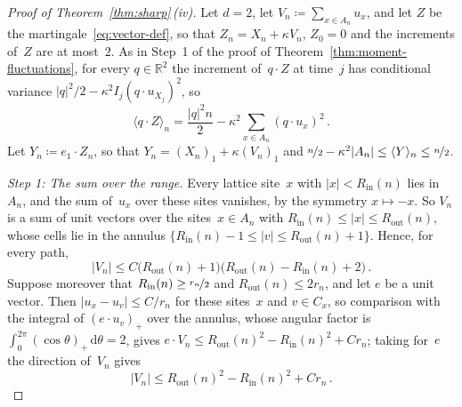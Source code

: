 \documentclass[11pt]{amsart}
\theoremstyle{plain}
\theoremstyle{definition}
\newcommand{\R}{\mathbb R}
\newcommand{\drift}{\kappa}
\newcommand{\dd}{\,\mathrm d}
\newcommand{\nf}{\nicefrac}
\newcommand{\Rin}{R_{\mathrm{in}}}
\newcommand{\Rout}{R_{\mathrm{out}}}
\numberwithin{equation}{section}
\begin{document}
\begin{proof}[Proof of Theorem~\ref{thm:sharp}\,\textup{(iv)}]
Let $d=2$, let $V_n\coloneqq\sum_{x\in A_n}u_x$, and let $Z$ be the martingale~\eqref{eq:vector-def}, so that $Z_n=X_n+\drift V_n$, $Z_0=0$ and the increments of~$Z$ are at most~$2$. As in Step~1 of the proof of Theorem~\ref{thm:moment-fluctuations}, for every $q\in\R^2$ the increment of~$q\cdot Z$ at time~$j$ has conditional variance $|q|^2/2-\drift^2I_j(q\cdot u_{X_j})^2$, so
\begin{equation}\label{eq:width-bracket}
\langle q\cdot Z\rangle_n=\frac{|q|^2n}2-\drift^2\sum_{x\in A_n}(q\cdot u_x)^2\, .
\end{equation}
Let $Y_n\coloneqq e_1\cdot Z_n$, so that $Y_n=(X_n)_1+\drift(V_n)_1$ and $\nf{n}{2}-\drift^2|A_n|\leq\langle Y\rangle_n\leq\nf{n}{2}$.

\emph{Step 1: The sum over the range.} Every lattice site~$x$ with $|x|<\Rin(n)$ lies in~$A_n$, and the sum of~$u_x$ over these sites vanishes, by the symmetry $x\mapsto-x$. So $V_n$ is a sum of unit vectors over the sites~$x\in A_n$ with $\Rin(n)\leq|x|\leq\Rout(n)$, whose cells lie in the annulus $\{\Rin(n)-1\leq|v|\leq\Rout(n)+1\}$. Hence, for every path,
\begin{equation*}
|V_n|\leq C\bigl(\Rout(n)+1\bigr)\bigl(\Rout(n)-\Rin(n)+2\bigr)\, .
\end{equation*}
Suppose moreover that $\Rin(n)\geq\nf{r_n}{2}$ and $\Rout(n)\leq2r_n$, and let $e$ be a unit vector. Then $|u_x-u_v|\leq C/r_n$ for these sites~$x$ and $v\in C_x$, so comparison with the integral of $(e\cdot u_v)_+$ over the annulus, whose angular factor is $\int_0^{2\pi}(\cos\theta)_+\dd\theta=2$, gives $e\cdot V_n\leq\Rout(n)^2-\Rin(n)^2+Cr_n$; taking for~$e$ the direction of~$V_n$ gives
\begin{equation}\label{eq:width-annulus}
|V_n|\leq\Rout(n)^2-\Rin(n)^2+Cr_n\, .
\end{equation}


\end{proof}
\end{document}
